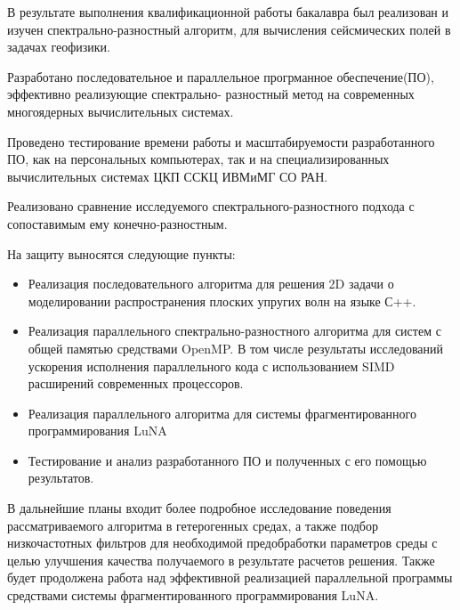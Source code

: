 
В результате выполнения квалификационной работы бакалавра был реализован и изучен спектрально-разностный алгоритм,
для вычисления сейсмических полей в задачах геофизики.

Разработано последовательное и параллельное прогрманное обеспечение(ПО), эффективно реализующие спектрально-
разностный метод на современных многоядерных вычислительных системах.

Проведено тестирование времени работы и масштабируемости разработанного ПО, как на персональных компьютерах,
так и на специализированных вычислительных системах ЦКП ССКЦ ИВМиМГ СО РАН.

Реализовано сравнение исследуемого спектрального-разностного подхода с сопоставимым ему конечно-разностным.

На защиту выносятся следующие пункты:

\begin{itemize}
    \item Реализация последовательного алгоритма для решения 2D задачи о моделировании
    распространения плоских упругих волн на языке С++.
    \item Реализация параллельного спектрально-разностного алгоритма для систем с общей памятью средствами OpenMP. В том числе
    результаты исследований ускорения исполнения параллельного кода с использованием SIMD расширений современных процессоров.
    \item Реализация параллельного алгоритма для системы фрагментированного программирования LuNA
    \item Тестирование и анализ разработанного ПО и полученных с его помощью результатов.
\end{itemize}

В дальнейшие планы входит более подробное исследование поведения рассматриваемого алгоритма в гетерогенных средах,
а также подбор низкочастотных фильтров для необходимой предобработки параметров среды с целью улучшения качества получаемого в результате расчетов решения.
Также будет продолжена работа над эффективной реализацией параллельной программы
средствами системы фрагментированного программирования LuNA.

\clearpage
